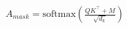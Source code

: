 \documentclass[preview]{standalone}
\begin{document}
\begin{align*}
A_{mask} = \mathrm{softmax}\left(\frac{QK^\top + M}{\sqrt{d_k}}\right)
\end{align*}
\end{document}
